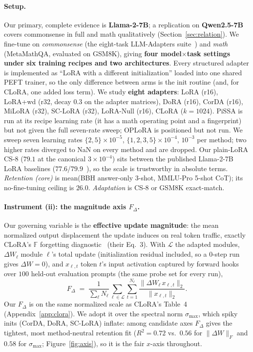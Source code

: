 \documentclass[11pt]{article}
\newcommand{\dw}{F_{\Delta}}
\newcommand{\smax}{\sigma_{\max}}
\begin{document}
\paragraph{Setup.} Our primary, complete evidence is \textbf{Llama-2-7B}; a
replication on \textbf{Qwen2.5-7B} covers commonsense in full and math
qualitatively (Section~\ref{sec:relation}). We fine-tune on \emph{commonsense}
(the eight-task LLM-Adapters suite~\citep{hu2023llmadapters}) and \emph{math}
(MetaMathQA, evaluated on GSM8K), giving \textbf{four model$\times$task settings
under six training recipes and two architectures}. Every structured adapter is
implemented as ``LoRA with a different initialization'' loaded into one shared
PEFT trainer, so the only difference between arms is the init routine (and, for
CLoRA, one added loss term). We study \textbf{eight adapters}: LoRA (r16),
LoRA{+}wd (r32, decay $0.3$ on the adapter matrices), DoRA (r16), CorDA (r16),
MiLoRA (r32), SC-LoRA (r32), LoRA-Null (r16), CLoRA ($k{=}1024$). PiSSA is run at
its recipe learning rate (it has a math operating point and a fingerprint) but not
given the full seven-rate sweep; OPLoRA is positioned but not run. We sweep seven
learning rates
$\{2,5\}{\times}10^{-5}$, $\{1,2,3,5\}{\times}10^{-4}$, $10^{-3}$ per method; two
higher rates diverged to NaN on every method and are dropped. Our plain-LoRA CS-8
($79.1$ at the canonical $3{\times}10^{-4}$) sits between the published Llama-2-7B
LoRA baselines ($77.6$/$79.9$~\citep{clora}), so the scale is trustworthy in
absolute terms. \emph{Retention (core)} is mean(BBH answer-only 3-shot, MMLU-Pro
5-shot CoT); its no-fine-tuning ceiling is $\mathbf{26.0}$. \emph{Adaptation} is
CS-8 or GSM8K exact-match.

\paragraph{Instrument (ii): the magnitude axis $\dw$.} Our governing variable is
the \textbf{effective update magnitude}: the mean normalized output displacement
the update induces on real token traffic, exactly CLoRA's $\mathbb{F}$ forgetting
diagnostic~\citep{clora} (their Eq.~3). With $\mathcal{L}$ the adapted modules,
$\Delta W_\ell$ module $\ell$'s total update (initialization residual included,
so a $0$-step run gives $\Delta W = 0$), and $x_{\ell,t}$ token $t$'s input
activation captured by forward hooks over $100$ held-out evaluation prompts (the
same probe set for every run),
\begin{equation}\label{eq:fdelta}
  \dw \;=\; \frac{1}{\sum_{\ell} N_\ell}
  \sum_{\ell\in\mathcal{L}} \sum_{t=1}^{N_\ell}
  \frac{\lVert \Delta W_\ell\, x_{\ell,t} \rVert_2}{\lVert x_{\ell,t} \rVert_2}.
\end{equation}
Our $\dw$ is on the same normalized scale as CLoRA's Table~4
(Appendix~\ref{app:clora}). We adopt it over the spectral norm $\smax$, which
spiky inits (CorDA, DoRA, SC-LoRA) inflate: among candidate axes $\dw$ gives the
tightest, most method-neutral retention fit ($R^2\!=\!0.72$ vs.\ $0.56$ for
$\lVert\Delta W\rVert_F$ and $0.58$ for $\smax$; Figure~\ref{fig:axis}), so it is
the fair $x$-axis throughout.
\end{document}
